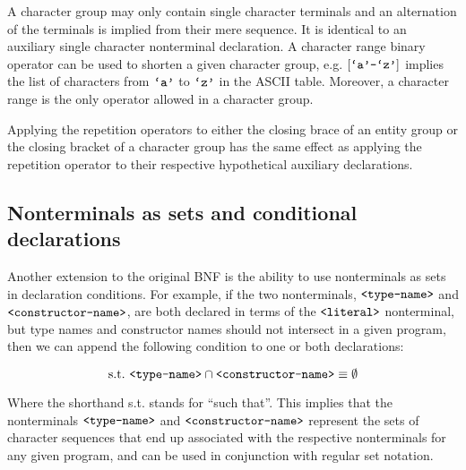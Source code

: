 A character group may only contain single character terminals and an
alternation of the terminals is implied from their mere sequence. It is
identical to an auxiliary single character nonterminal declaration. A character
range binary operator can be used to shorten a given character group, e.g.
$[\text{{\ttfamily`a'}}\text{{\ttfamily-}}\text{{\ttfamily`z'}}]$ implies the list of characters from $\text{{\ttfamily`a'}}$
to $\text{{\ttfamily`z'}}$ in the ASCII table.  Moreover, a character range is the only
operator allowed in a character group.

Applying the repetition operators to either the closing brace of an entity
group or the closing bracket of a character group has the same effect as
applying the repetition operator to their respective hypothetical auxiliary
declarations.

\subsection{Nonterminals as sets and conditional declarations}

Another extension to the original BNF is the ability to use nonterminals as
sets in declaration conditions. For example, if the two nonterminals,
$\text{{\ttfamily<type-name>}}$ and $\text{{\ttfamily<constructor-name>}}$, are both declared in
terms of the $\text{{\ttfamily<literal>}}$ nonterminal, but type names and constructor
names should not intersect in a given program, then we can append the following
condition to one or both declarations:

$$\text{s.t.}\
\text{{\ttfamily<type-name>}}\cap\text{{\ttfamily<constructor-name>}}\equiv\emptyset$$

Where the shorthand s.t. stands for ``such that''. This implies that the
nonterminals $\text{{\ttfamily<type-name>}}$ and $\text{{\ttfamily<constructor-name>}}$ represent
the sets of character sequences that end up associated with the respective
nonterminals for any given program, and can be used in conjunction with regular
set notation.
